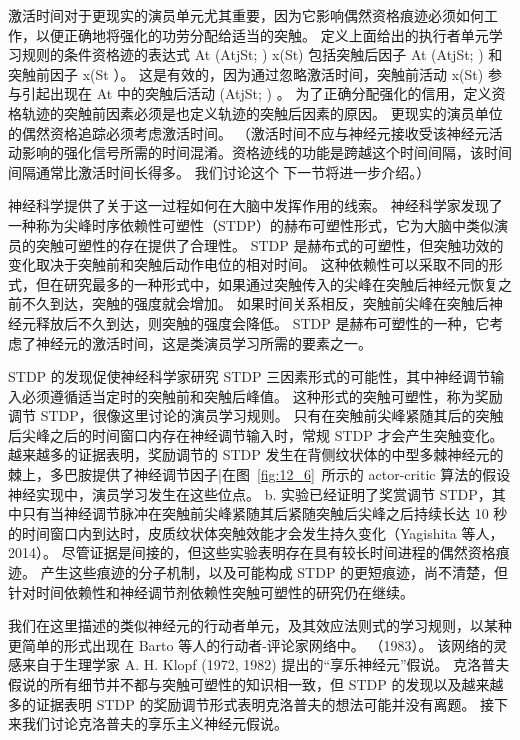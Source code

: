 激活时间对于更现实的演员单元尤其重要，因为它影响偶然资格痕迹必须如何工作，以便正确地将强化的功劳分配给适当的突触。 定义上面给出的执行者单元学习规则的条件资格迹的表达式 At (AtjSt; ) x(St) 包括突触后因子 At (AtjSt; ) 和突触前因子 x(St ）。
这是有效的，因为通过忽略激活时间，突触前活动 x(St) 参与引起出现在 At 中的突触后活动 (AtjSt; ) 。
为了正确分配强化的信用，定义资格轨迹的突触前因素必须是也定义轨迹的突触后因素的原因。
更现实的演员单位的偶然资格追踪必须考虑激活时间。
（激活时间不应与神经元接收受该神经元活动影响的强化信号所需的时间混淆。资格迹线的功能是跨越这个时间间隔，该时间间隔通常比激活时间长得多。
我们讨论这个 下一节将进一步介绍。）


神经科学提供了关于这一过程如何在大脑中发挥作用的线索。
神经科学家发现了一种称为尖峰时序依赖性可塑性（STDP）的赫布可塑性形式，它为大脑中类似演员的突触可塑性的存在提供了合理性。
STDP 是赫布式的可塑性，但突触功效的变化取决于突触前和突触后动作电位的相对时间。
这种依赖性可以采取不同的形式，但在研究最多的一种形式中，如果通过突触传入的尖峰在突触后神经元恢复之前不久到达，突触的强度就会增加。
如果时间关系相反，突触前尖峰在突触后神经元释放后不久到达，则突触的强度会降低。
STDP 是赫布可塑性的一种，它考虑了神经元的激活时间，这是类演员学习所需的要素之一。


STDP 的发现促使神经科学家研究 STDP 三因素形式的可能性，其中神经调节输入必须遵循适当定时的突触前和突触后峰值。
这种形式的突触可塑性，称为奖励调节 STDP，很像这里讨论的演员学习规则。
只有在突触前尖峰紧随其后的突触后尖峰之后的时间窗口内存在神经调节输入时，常规 STDP 才会产生突触变化。
越来越多的证据表明，奖励调节的 STDP 发生在背侧纹状体的中型多棘神经元的棘上，多巴胺提供了神经调节因子|在图~\ref{fig:12_6}~所示的 actor-critic 算法的假设神经实现中，演员学习发生在这些位点。
b. 实验已经证明了奖赏调节 STDP，其中只有当神经调节脉冲在突触前尖峰紧随其后紧随突触后尖峰之后持续长达 10 秒的时间窗口内到达时，皮质纹状体突触效能才会发生持久变化（Yagishita 等人，2014）。
尽管证据是间接的，但这些实验表明存在具有较长时间进程的偶然资格痕迹。
产生这些痕迹的分子机制，以及可能构成 STDP 的更短痕迹，尚不清楚，但针对时间依赖性和神经调节剂依赖性突触可塑性的研究仍在继续。


我们在这里描述的类似神经元的行动者单元，及其效应法则式的学习规则，以某种更简单的形式出现在 Barto 等人的行动者-评论家网络中。 （1983）。
该网络的灵感来自于生理学家 A. H. Klopf (1972, 1982) 提出的“享乐神经元”假说。
克洛普夫假说的所有细节并不都与突触可塑性的知识相一致，但 STDP 的发现以及越来越多的证据表明 STDP 的奖励调节形式表明克洛普夫的想法可能并没有离题。
接下来我们讨论克洛普夫的享乐主义神经元假说。



